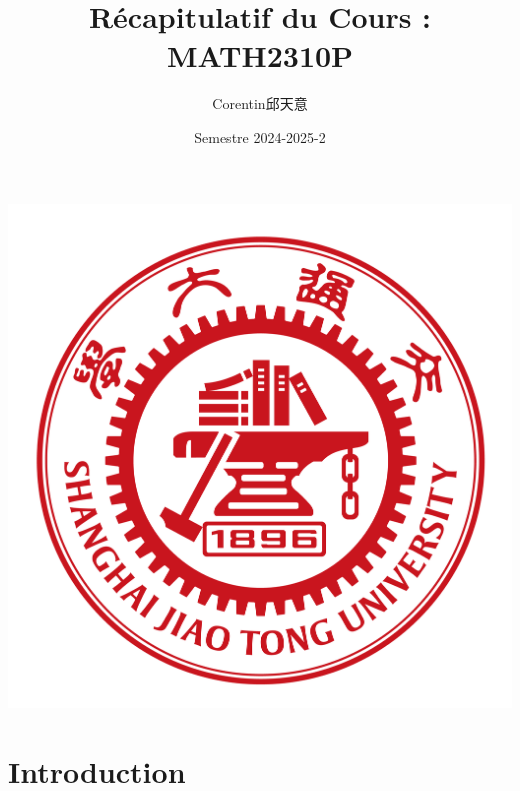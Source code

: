 \documentclass{article}
\title{\textbf{Récapitulatif du Cours :\\ MATH2310P}}
\author{Corentin邱天意}
\date{Semestre 2024-2025-2}
\begin{document}
\maketitle

\centerline{\includegraphics[scale=0.4]{sjtu}}

\newpage

\section*{Introduction}



\newpage
\tableofcontents

\newpage
\end{document}

